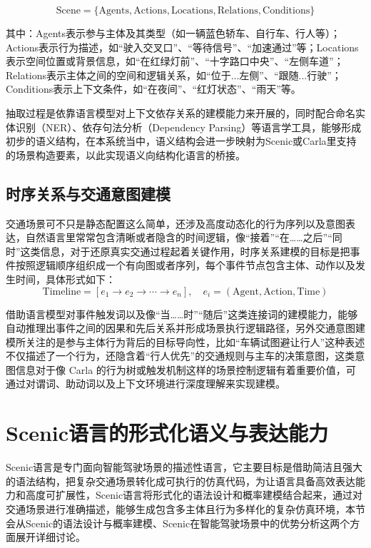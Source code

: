 \begin{equation}
	\text{Scene} = \{ \text{Agents}, \text{Actions}, \text{Locations}, \text{Relations}, \text{Conditions} \}
\end{equation}

其中：Agents表示参与主体及其类型（如一辆蓝色轿车、自行车、行人等）；Actions表示行为描述，如“驶入交叉口”、“等待信号”、“加速通过”等；Locations表示空间位置或背景信息，如“在红绿灯前”、“十字路口中央”、“左侧车道”；Relations表示主体之间的空间和逻辑关系，如“位于...左侧”、“跟随...行驶”；Conditions表示上下文条件，如“在夜间”、“红灯状态”、“雨天”等。


抽取过程是依靠语言模型对上下文依存关系的建模能力来开展的，同时配合命名实体识别（NER）、依存句法分析（Dependency Parsing）等语言学工具，能够形成初步的语义结构，在本系统当中，语义结构会进一步映射为Scenic或Carla里支持的场景构造要素，以此实现语义向结构化语言的桥接。

\subsection{时序关系与交通意图建模}

交通场景可不只是静态配置这么简单，还涉及高度动态化的行为序列以及意图表达，自然语言里常常包含清晰或者隐含的时间逻辑，像“接着”“在……之后”“同时”这类信息，对于还原真实交通过程起着关键作用，时序关系建模的目标是把事件按照逻辑顺序组织成一个有向图或者序列，每个事件节点包含主体、动作以及发生时间，具体形式如下：
\begin{equation}
	\text{Timeline} = \left[ e_1 \rightarrow e_2 \rightarrow \cdots \rightarrow e_n \right], \quad e_i = (\text{Agent}, \text{Action}, \text{Time})
\end{equation}

借助语言模型对事件触发词以及像“当……时”“随后”这类连接词的建模能力，能够自动推理出事件之间的因果和先后关系并形成场景执行逻辑路径，另外交通意图建模所关注的是参与主体行为背后的目标导向性，比如“车辆试图避让行人”这种表述不仅描述了一个行为，还隐含着“行人优先”的交通规则与主车的决策意图，这类意图信息对于像 Carla 的行为树或触发机制这样的场景控制逻辑有着重要价值，可通过对谓词、助动词以及上下文环境进行深度理解来实现建模。


\section{Scenic语言的形式化语义与表达能力}

Scenic语言是专门面向智能驾驶场景的描述性语言，它主要目标是借助简洁且强大的语法结构，把复杂交通场景转化成可执行的仿真代码，为让语言具备高效表达能力和高度可扩展性，Scenic语言将形式化的语法设计和概率建模结合起来，通过对交通场景进行准确描述，能够生成包含多主体且行为多样化的复杂仿真环境，本节会从Scenic的语法设计与概率建模、Scenic在智能驾驶场景中的优势分析这两个方面展开详细讨论。

